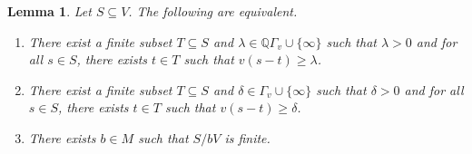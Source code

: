 \documentclass{article}
\newtheorem{Lem}[equation]{Lemma}
\theoremstyle{definition}\newtheorem{Def}[equation]{Definition}
\theoremstyle{definition}\newtheorem{Ques}[equation]{Question}
\theoremstyle{definition}\newtheorem{Conj}[equation]{Conjecture}
\theoremstyle{definition}\newtheorem{Not}[equation]{Notation}
\newcommand{\Q}{\mathbb{Q}}
\numberwithin{equation}{section}
\begin{document}
\begin{Lem}\label{delta balls equivalence}
Let $S \subseteq V$. The following are equivalent.
\begin{enumerate}[(1)]
\item  There exist a finite subset $T \subseteq S$ and $\lambda \in \Q\Gamma_v\cup\{\infty\}$ such that $\lambda>0$ and for all $s \in S$, there exists $t \in T$ such that $v(s - t) \geq \lambda$.
\item There exist a finite subset $T \subseteq S$ and $\delta \in \Gamma_v\cup\{\infty\}$ such that $\delta>0$ and for all $s \in S$, there exists $t \in T$ such that $v(s - t) \geq \delta$.
\item There exists $b \in M$ such that $S/bV$ is finite.
\end{enumerate}
\end{Lem}
\end{document}
